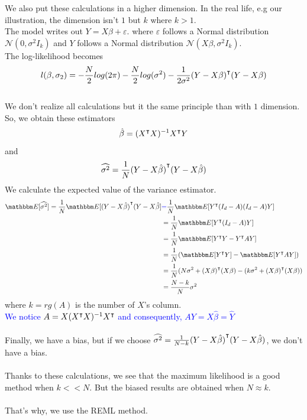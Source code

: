 \documentclass{article}
\begin{document}
We also put these calculations in a higher dimension. In the real life, e.g our illustration, the dimension isn't $1$ but $k$ where $k>1$.\\
The model writes out $Y=X \beta + \varepsilon$.
where $\varepsilon$ follows a Normal distribution $\mathcal{N}(0, \sigma^2 I_k)$ and $Y$ follows a Normal distribution $\mathcal{N}(X\beta, \sigma^2I_k)$.\\
The log-likelihood becomes 
\[ l(\beta, \sigma_2) = -\frac{N}{2}log(2\pi)-\frac{N}{2} log(\sigma^2)-\frac{1}{2\sigma^2}{(Y-X\beta)}^\intercal(Y-X\beta) \]
\\
We don't realize all calculations but it the same principle than with $1$ dimension. So, we obtain these estimators \\
\[ \hat{\beta} = ({X}^\intercal{X})^{-1}{X}^\intercal Y \] and \[ \widehat{\sigma^2} = \frac{1}{N}{(Y-X\hat{\beta})}^\intercal(Y-X\hat{\beta})\]
We calculate the expected value of the variance estimator.
\begin{equation*}
    \begin{split}
       \esp[\widehat{\sigma^2}]=\frac{1}{N}\esp[\trans{(Y-X\hat{\beta})}(Y-X\hat{\beta}]
       &\textcolor{blue}{=} \frac{1}{N}\esp[\trans{Y}(I_d-A)(I_d-A)Y]\\
       &= \frac{1}{N}\esp[\trans{Y}(I_d-A)Y]\\
       &= \frac{1}{N}\esp[\trans{Y}Y-\trans{Y}AY]\\
       &= \frac{1}{N}(\esp[\trans{Y}Y]-\esp[\trans{Y}AY])\\
       &= \frac{1}{N}(N\sigma^2+\trans{(X\beta)}(X\beta)-(k\sigma^2+\trans{(X\beta)}(X\beta))\\
       &= \frac{N-k}{N}\sigma^2
    \end{split}
\end{equation*}
where $k=rg(A)$ is the number of $X$'s column.\\
\textcolor{blue}{We notice $A=X({X}^\intercal X)^{-1}{X}^\intercal$ and consequently, $AY=X\hat{\beta} = \hat{Y}$}\\
\\
Finally, we have a bias, but if we choose $\widehat{\sigma^2}=\frac{1}{N-k}{(Y-X\hat{\beta})}^\intercal(Y-X\hat{\beta})$, we don't have a bias.\\
\\
Thanks to these calculations, we see that the maximum likelihood is a good method when $k << N$. But the biased results are obtained when $N\approx k$.\\
\\
That's why, we use the REML method.
\end{document}
